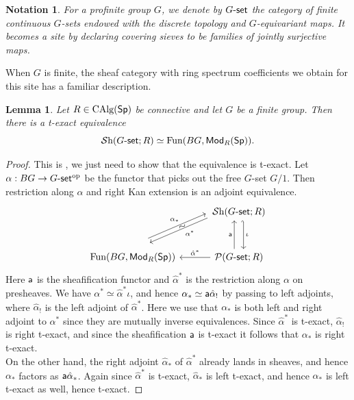 \documentclass[reqno]{amsart}
\numberwithin{equation}{section}\theoremstyle{thms}
\newtheorem{lem}[equation]{Lemma}
\theoremstyle{defn}
\newtheorem{nota}[equation]{Notation}
\newcommand{\cP}{\mathcal{P}}
\newcommand{\tn}[1]{\textnormal{#1}}
\newcommand{\tsf}[1]{\textsf{\textup{#1}}}
\newcommand{\mcal}[1]{\mathcal{#1}}
\newcommand{\op}{\tn{op}}
\newcommand{\fun}{\tn{Fun}}
\newcommand{\sheaves}{\mcal{S}\tn{h}}
\newcommand{\calg}{\tn{CAlg}}
\newcommand{\Mod}{\tsf{Mod}}
\newcommand{\spec}{\tsf{Sp}}
\newcommand{\gset}{G\tsf{-set}}
\begin{document}
\begin{nota}
For a profinite group $G$, we denote by $\gset$ the category of finite continuous $G$-sets endowed with the discrete topology and $G$-equivariant maps. It becomes a site by declaring covering sieves to be families of jointly surjective maps.
\end{nota}

When $G$ is finite, the sheaf category with ring spectrum coefficients we obtain for this site has a familiar description. 

\begin{lem}\label{lem:sheavesfunbg}
Let $R \in \calg(\spec)$ be connective and let $G$ be a finite group. Then there is a t-exact equivalence
$$\sheaves(\gset;R) \simeq \fun(BG,\Mod_R(\spec)).$$
\end{lem}
\begin{proof}
This is \cite[Example 4.4]{cm21}, we just need to show that the equivalence is t-exact. Let $\alpha: BG \to \gset^\op$ be the functor that picks out the free $G$-set $G/1$. Then restriction along $\alpha$ and right Kan extension is an adjoint equivalence.
\[\begin{tikzcd}[column sep=30, row sep=30]
	& {\sheaves(\gset;R)} \\
	{\fun(BG,\Mod_R(\spec))} & {\cP(\gset;R)}
	\arrow["{\alpha^*}", shift right=3, shorten <=10pt, from=1-2, to=2-1]
	\arrow[""{name=0, anchor=center, inner sep=0}, "\iota", shift left=2, hook', from=1-2, to=2-2]
	\arrow["{\alpha_*}", shift left=5, shorten >=10pt, from=2-1, to=1-2]
	\arrow["\sim"{marking, allow upside down}, shift left=4, draw=none, from=2-1, to=1-2]
	\arrow[""{name=3, anchor=center, inner sep=0}, "{\tsf{a}}", shift left=2, from=2-2, to=1-2]
	\arrow[""{name=4, anchor=center, inner sep=0}, "{\hat{\alpha}^*}"', from=2-2, to=2-1]
\end{tikzcd}\]
Here $\tsf{a}$ is the sheafification functor and $\hat{\alpha}^*$ is the restriction along $\alpha$ on presheaves. We have $\alpha^* \simeq \hat{\alpha}^*\iota$, and hence $\alpha_* \simeq \tsf{a}\hat{\alpha}_! $ by passing to left adjoints, where $\hat{\alpha}_!$ is the left adjoint of $\hat{\alpha}^*$. Here we use that $\alpha_*$ is both left and right adjoint to $\alpha^*$ since they are mutually inverse equivalences. Since $\hat{\alpha}^*$ is t-exact, $\hat{\alpha}_!$ is right t-exact, and since the sheafification $\tsf{a}$ is t-exact it follows that $\alpha_*$ is right t-exact. \\
On the other hand, the right adjoint $\hat{\alpha}_*$ of $\hat{\alpha}^*$ already lands in sheaves, and hence $\alpha_*$ factors as $\tsf{a}\hat{\alpha}_*$. Again since $\hat{\alpha}^*$ is t-exact, $\hat{\alpha}_*$ is left t-exact, and hence $\alpha_*$ is left t-exact as well, hence t-exact.
\end{proof}
\end{document}
